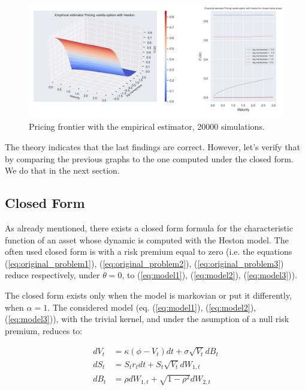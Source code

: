 \begin{figure}
\centering
   \includegraphics[width = 0.9 \textwidth]{../addition_part/images/integration_fft/empirical_pricing_5000_cover.png}
   \caption{Pricing frontier with the empirical estimator, 20000 simulations.}
   \label{fig:simulations_empirical_pricing_2}
\end{figure}


The theory indicates that the last findings are correct. However, let's verify that by comparing the previous graphs to the one computed under the closed form. We do that in the next section.



\subsection{Closed Form}

As already mentioned, there exists a closed form formula for the characteristic function of an asset whose dynamic is computed with the Heston model. The often used closed form is with a risk premium equal to zero (i.e. the equations (\ref{eq:original_problem1}), (\ref{eq:original_problem2}), (\ref{eq:original_problem3}) reduce respectively, under $\theta = 0$, to (\ref{eq:model1}), (\ref{eq:model2}), (\ref{eq:model3})).

The closed form exists only when the model is markovian or put it differently, when $\alpha = 1$. The considered model (eq. (\ref{eq:model1}), (\ref{eq:model2}), (\ref{eq:model3})), with the trivial kernel, and under the asumption of a null risk premium, reduces to:


\begin{align}
d V_t &= \kappa  (  \phi - V_t ) dt + \sigma \sqrt{V_t} dB_t \\
d S_t &= S_t r_t dt + S_t \sqrt{V_t} d W_{1,t} \\
d B_t &= \rho d W_{1,t} + \sqrt{1- \rho^2 } d W_{2,t} 
\end{align}


